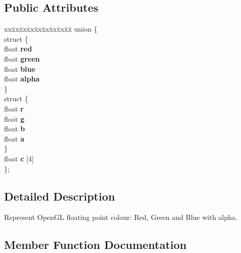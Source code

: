 \subsection*{Public Attributes}
\begin{DoxyCompactItemize}
\item 
\begin{tabbing}
xx\=xx\=xx\=xx\=xx\=xx\=xx\=xx\=xx\=\kill
union \{\\
\>struct \{\\
\>\>float {\bfseries red}\\
\>\>float {\bfseries green}\\
\>\>float {\bfseries blue}\\
\>\>float {\bfseries alpha}\\
\>\} \hypertarget{unionpangolin_1_1_colour_1_1_0D2_ac14aaf73fa8a358f8058cfbcb2d05fd2}{}\label{unionpangolin_1_1_colour_1_1_0D2_ac14aaf73fa8a358f8058cfbcb2d05fd2}
\\
\>struct \{\\
\>\>float {\bfseries r}\\
\>\>float {\bfseries g}\\
\>\>float {\bfseries b}\\
\>\>float {\bfseries a}\\
\>\} \hypertarget{unionpangolin_1_1_colour_1_1_0D2_a160340ce5224aabe94ae3477e41a540e}{}\label{unionpangolin_1_1_colour_1_1_0D2_a160340ce5224aabe94ae3477e41a540e}
\\
\>float {\bfseries c} \mbox{[}4\mbox{]}\\
\}; \hypertarget{structpangolin_1_1_colour_a4054bd432b1a1774b709474ca99a21c1}{}\label{structpangolin_1_1_colour_a4054bd432b1a1774b709474ca99a21c1}
\\

\end{tabbing}\end{DoxyCompactItemize}


\subsection{Detailed Description}
Represent Open\+GL floating point colour\+: Red, Green and Blue with alpha. 

\subsection{Member Function Documentation}
